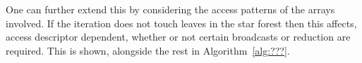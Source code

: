 \documentclass[thesis]{subfiles}
\begin{document}
One can further extend this by considering the access patterns of the arrays involved.
If the iteration does not touch leaves in the star forest then this affects, access descriptor dependent, whether or not certain broadcasts or reduction are required.
This is shown, alongside the rest in Algorithm~\ref{alg:???}.

\end{document}
